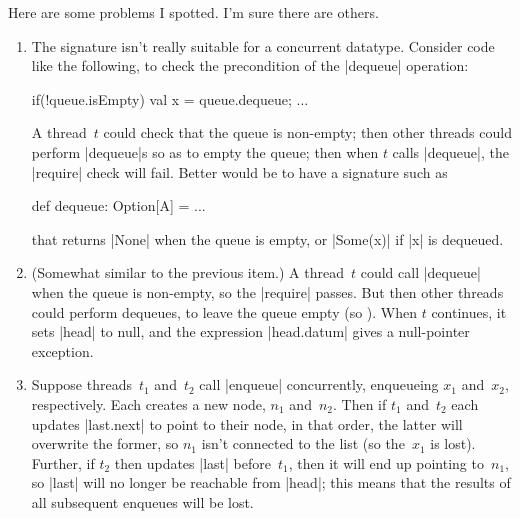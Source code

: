 
\begin{answerI}
Here are some problems I spotted.  I'm sure there are others.
\begin{enumerate}
\item
The signature isn't really suitable for a concurrent datatype.  Consider code
like the following, to check the precondition of the |dequeue| operation:
%
\begin{scala}
  if(!queue.isEmpty){ val x = queue.dequeue; ... }
\end{scala}
%
A thread~$t$ could check that the queue is non-empty; then other threads could
perform |dequeue|s so as to empty the queue; then when $t$ calls |dequeue|,
the |require| check will fail.  Better would be to have a signature such as
\begin{scala}
  def dequeue: Option[A] = ...
\end{scala}
that returns |None| when the queue is empty, or |Some(x)| if |x| is dequeued.


\item (Somewhat similar to the previous item.)  A thread~$t$ could call
  |dequeue| when the queue is non-empty, so the |require| passes.  But then
  other threads could perform dequeues, to leave the queue empty (so
  ).  When $t$ continues, it sets |head| to null, and
  the expression |head.datum| gives a null-pointer exception.


\item Suppose threads~$t_1$ and~$t_2$ call |enqueue| concurrently, enqueueing
  $x_1$ and~$x_2$, respectively.  Each creates a new node, $n_1$ and~$n_2$.
  Then if $t_1$ and~$t_2$ each updates |last.next| to point to their node, in
  that order, the latter will overwrite the former, so $n_1$ isn't connected
  to the list (so the~$x_1$ is lost).  Further, if $t_2$ then updates |last|
  before~$t_1$, then it will end up pointing to~$n_1$, so |last| will no
  longer be reachable from |head|; this means that the results of all
  subsequent enqueues will be lost.


\end{enumerate}
\end{answerI}
